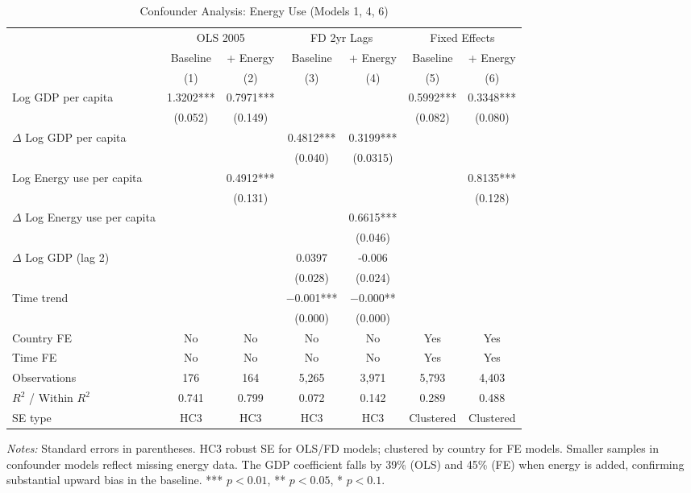 \documentclass[12pt, a4paper]{article}
\begin{document}
\begin{table}[H]
\centering
\caption{Confounder Analysis: Energy Use (Models 1, 4, 6)}
\label{tab:confounders}
\begin{adjustbox}{max width=\textwidth}
\begin{threeparttable}
\small
\setlength{\tabcolsep}{5pt}
\begin{tabular}{lcccccc}
\toprule
 & \multicolumn{2}{c}{OLS 2005} & \multicolumn{2}{c}{FD 2yr Lags} & \multicolumn{2}{c}{Fixed Effects} \\
\cmidrule(lr){2-3}\cmidrule(lr){4-5}\cmidrule(lr){6-7}
 & Baseline & + Energy & Baseline & + Energy & Baseline & + Energy \\
 & (1) & (2) & (3) & (4) & (5) & (6) \\
\midrule
Log GDP per capita
    & 1.3202*** & 0.7971*** & & & 0.5992*** & 0.3348*** \\
    & (0.052)   & (0.149)   & & & (0.082)   & (0.080)   \\[4pt]
$\Delta$ Log GDP per capita
    & & & 0.4812*** & 0.3199*** & & \\
    & & & (0.040)   & (0.0315)   & & \\[4pt]
Log Energy use per capita
    & & 0.4912*** & & & & 0.8135*** \\
    & & (0.131)   & & & & (0.128)   \\[4pt]
$\Delta$ Log Energy use per capita
    & & & & 0.6615*** & & \\
    & & & & (0.046)   & & \\[4pt]
$\Delta$ Log GDP (lag 2)
    & & & 0.0397 & -0.006 & & \\
    & & & (0.028) & (0.024) & & \\[4pt]
Time trend
    & & & $-$0.001*** & $-$0.000** & & \\
    & & & (0.000)     & (0.000)    & & \\
\midrule
Country FE   & No  & No  & No    & No    & Yes   & Yes   \\
Time FE      & No  & No  & No    & No    & Yes   & Yes   \\
Observations & 176 & 164 & 5,265 & 3,971 & 5,793 & 4,403 \\
$R^2$ / Within $R^2$ & 0.741 & 0.799 & 0.072 & 0.142 & 0.289 & 0.488 \\
SE type & HC3 & HC3 & HC3 & HC3 & Clustered & Clustered \\
\bottomrule
\end{tabular}
\begin{tablenotes}
\small
\item \textit{Notes:} Standard errors in parentheses. HC3 robust SE for OLS/FD models; clustered by country for FE models. Smaller samples in confounder models reflect missing energy data. The GDP coefficient falls by 39\% (OLS) and 45\% (FE) when energy is added, confirming substantial upward bias in the baseline. *** $p<0.01$, ** $p<0.05$, * $p<0.1$.
\end{tablenotes}
\end{threeparttable}
\end{adjustbox}
\end{table}
\end{document}
